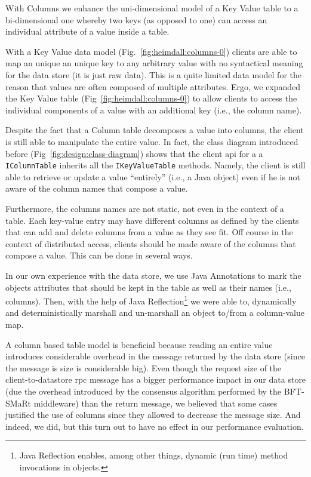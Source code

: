 With Columns we enhance the uni-dimensional model of a Key Value table  to a bi-dimensional one whereby two keys (as opposed to one) can access an individual attribute of a value inside a table.  

With a Key Value data model (Fig.~\ref{fig:heimdall:columns-0}) clients are able to map an unique an unique key to any arbitrary value with no syntactical meaning for the data store (it is just raw data). 
This is a quite limited data model for the reason that values are often composed of multiple attributes. 
Ergo, we expanded the Key Value table (Fig~\ref{fig:heimdall:columns-0}) to allow clients to access the individual components of a value with an additional key (i.e., the column name). 


Despite the fact that a Column table decomposes a value into columns, the client is still able to manipulate the entire value.
In fact, the class diagram introduced before (Fig~\ref{fig:design:class-diagram}) shows that the client \gls{api} for a a \texttt{IColumnTable} inherits all the \texttt{IKeyValueTable} methods. 
Namely, the client is still able to retrieve or update a value  ``entirely'' (i.e., a Java object) even if he is not aware of  the column names that compose a value. 

Furthermore, the columns names are not static, not even in the context of  a table. Each key-value entry may have different columns as defined by the clients that can add and delete columns from a value as they see fit. 
Off course in the context of distributed access, clients should be made aware of the columns that compose a value. 
This can be done in several ways. 

In our own experience with the data store, we use Java Annotations to mark the objects attributes that should be kept in the table  as well as their names (i.e., columns). 
Then, with the help of Java Reflection\footnote{Java Reflection enables, among other things, dynamic (run time) method invocations in objects.} we were able to, dynamically and deterministically marshall and un-marshall an object to/from a column-value map.  


A column based table model is beneficial because reading an entire value introduces considerable overhead in the message returned by the data store (since the message is size is considerable big).
Even though the request size of the client-to-datastore \gls{rpc} message has a bigger performance impact in our data store (due the overhead introduced by the consensus algorithm performed by the BFT-SMaRt middleware) than the return message, we believed that some cases justified the use of columns since they allowed to decrease the message size. 
And indeed, we did, but this turn out to have no effect in our performance evaluation.
 
